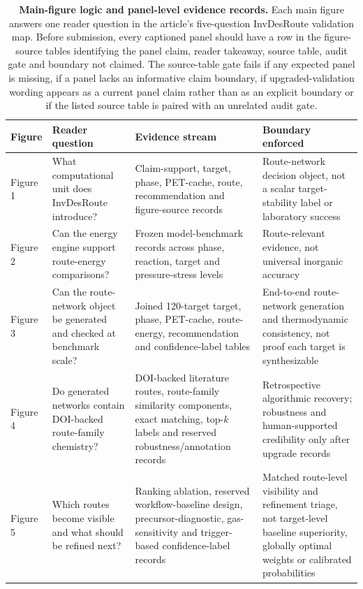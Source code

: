 \documentclass[11pt, letterpaper]{article}
\begin{document}
\begin{table}[p]
\centering
\scriptsize
\caption{\textbf{Main-figure logic and panel-level evidence records.} Each main figure answers one reader question in the article's five-question InvDesRoute validation map. Before submission, every captioned panel should have a row in the figure-source tables identifying the panel claim, reader takeaway, source table, audit gate and boundary not claimed. The source-table gate fails if any expected panel is missing, if a panel lacks an informative claim boundary, if upgraded-validation wording appears as a current panel claim rather than as an explicit boundary or if the listed source table is paired with an unrelated audit gate.}
\begin{tabular}{L{0.12\textwidth}L{0.23\textwidth}L{0.30\textwidth}L{0.23\textwidth}}
\toprule
\textbf{Figure} & \textbf{Reader question} & \textbf{Evidence stream} & \textbf{Boundary enforced} \\
\midrule
Figure 1 & What computational unit does InvDesRoute introduce? & Claim-support, target, phase, PET-cache, route, recommendation and figure-source records & Route-network decision object, not a scalar target-stability label or laboratory success \\
Figure 2 & Can the energy engine support route-energy comparisons? & Frozen model-benchmark records across phase, reaction, target and pressure-stress levels & Route-relevant evidence, not universal inorganic accuracy \\
Figure 3 & Can the route-network object be generated and checked at benchmark scale? & Joined 120-target target, phase, PET-cache, route-energy, recommendation and confidence-label tables & End-to-end route-network generation and thermodynamic consistency, not proof each target is synthesizable \\
Figure 4 & Do generated networks contain DOI-backed route-family chemistry? & DOI-backed literature routes, route-family similarity components, exact matching, top-$k$ labels and reserved robustness/annotation records & Retrospective algorithmic recovery; robustness and human-supported credibility only after upgrade records \\
Figure 5 & Which routes become visible and what should be refined next? & Ranking ablation, reserved workflow-baseline design, precursor-diagnostic, gas-sensitivity and trigger-based confidence-label records & Matched route-level visibility and refinement triage, not target-level baseline superiority, globally optimal weights or calibrated probabilities \\
\bottomrule
\end{tabular}
\label{supp-tab:figure_logic_contract}
\end{table}
\end{document}
